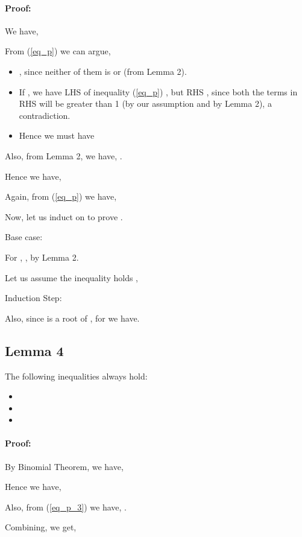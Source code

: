 \documentclass{ijcsa}
\begin{document}
\paragraph{Proof:}
\label{sec:Proof_3}
We have,

\par From (\ref{eq_p}) we can argue,
\begin{itemize}
\item	, since neither of them is  or  (from Lemma 2).
\item If , we have LHS of inequality (\ref{eq_p}) , but RHS , since both 
the terms in RHS will be greater than 1 (by our assumption and by Lemma 2), a contradiction. 
\item Hence we must have 
	
\end{itemize}
\par Also, from Lemma 2, we have, .
\par Hence we have,
	
	
\par Again, from (\ref{eq_p}) we have,

\par Now, let us induct on  to prove .
\par Base case: 
\par For , , by Lemma 2.
\par Let us assume the inequality holds ,  
\par Induction Step:

Also, since  is a root of , for  we have.


\subsection{Lemma 4}
\label{sec:Lemma4}
\par The following inequalities always hold:
\begin{itemize}
\item 
\item 
\item 
\end{itemize}
\paragraph{Proof:}
\label{sec:Proof_4}
\par By Binomial Theorem, we have, 
  	
\par Hence we have, 
\par Also, from (\ref{eq_p_3}) we have, . 
\par Combining, we get, 
\end{document}
